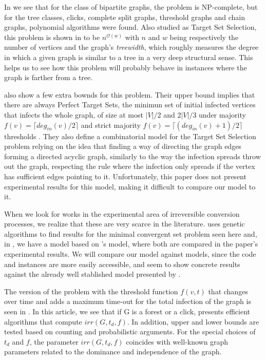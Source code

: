 In \cite{Reddy2010} we see that for the class of bipartite graphs, the problem is NP-complete, but for the tree classes,
clicks, complete split graphs, threshold graphs and chain graphs, polynomial algorithms were found. Also studied as Target Set Selection, this problem is shown in \cite{BenZwi2009} to be $n^{\mathcal{O}(w)}$ with $n$ and $w$ being respectively the number of vertices and the graph's\textit{ treewidth}, which roughly measures the degree in which a given graph is similar to a tree in a very deep structural sense. This helps us to see how this problem will probably behave in instances where the graph is farther from a tree.

\citeauthor{Ackerman2010} also show a few extra bownds for this problem. Their upper bound implies that there are always Perfect Target Sets, the minimun set of initial infected vertices that infects the whole graph,  of size at most $|V|/2 $ and $ 2|V|/3$ under majority  $f(v)=\lceil deg_{in}(v)/2 \rceil $ and strict majority $f(v)=\lceil (deg_{in}(v) + 1)/2 \rceil$ thresholds . They also define a combinatorial model for the Target Set Selection problem relying on the idea that finding a way of directing the graph edges forming a directed acyclic graph, similarly to the way the infection spreads throw out the graph, respecting the rule where the infection only spreads if the vertex has sufficient edges pointing to it.  Unfortunately, this paper does not present experimental results for this model, making it difficult to compare our model to it. 

When we look for works in the experimental area of irreversible conversion processes, we realize that these are very scarce in the literature.\citeauthor{amaral2015} uses genetic algorithms to find results for the minimal convergent set problem seen here and, in \cite{Soltani2019}, we have a model based on \citeauthor{Ackerman2010}'s model,  where both are compared in the paper's experimental results. We will compare our model against \citeauthor{Soltani2019} models, since the code and instances are more easily accessible, and seem to show concrete results against the already well stablished model presented by \citeauthor{Ackerman2010}.


The version of the problem with the threshold function $ f (v, t) $ that changes over time and adds a maximum time-out for the total infection of the graph is seen in \cite{rautenbach2014}. In this article, we see that if G is a forest or a click, \citeauthor{rautenbach2014} presents efficient algorithms that compute $ irr (G, t_d, f) $. In addition, upper and lower bounds are tested based on counting and probabilistic arguments. For the special choices of $ t_d $ and $ f $, the parameter $ irr (G, t_d, f) $ coincides with well-known graph parameters related to the dominance and independence of the graph.

